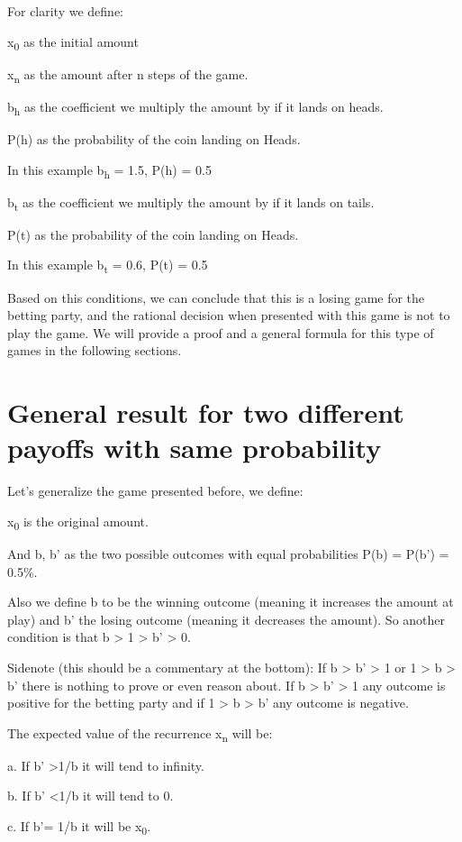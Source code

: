 \documentclass[12pt,reqno]{amsart}
\begin{document}
For clarity we define:

x\textsubscript{0} as the initial amount

x\textsubscript{n} as the amount after n steps of the game.

b\textsubscript{h} as the coefficient we multiply the amount by if it lands on heads.

P(h) as the probability of the coin landing on Heads. 

In this example b\textsubscript{h} = 1.5, P(h) = 0.5

b\textsubscript{t} as the coefficient we multiply the amount by if it lands on tails.

P(t) as the probability of the coin landing on Heads. 

In this example b\textsubscript{t} = 0.6, P(t) = 0.5

Based on this conditions, we can conclude that this is a losing game for the betting party, and the rational decision when presented with this game is not to play the game. We will provide a proof and a general formula for this type of games in the following sections.


\section{General result for two different payoffs with same probability}

Let's generalize the game presented before, we define:

x\textsubscript{0} is the original amount.

And b, b' as the two possible outcomes with equal probabilities P(b) = P(b') = 0.5\%. 

Also we define b to be the winning outcome (meaning it increases the amount at play) and b' the losing outcome (meaning it decreases the amount). So another condition is that b > 1 > b' > 0.

Sidenote (this should be a commentary at the bottom): If b > b' > 1 or 1 > b > b' there is nothing to prove or even reason about. If b > b' > 1 any outcome is positive for the betting party and if 1 > b > b' any outcome is negative. 

The expected value of the recurrence x\textsubscript{n} will be:

a. If b' \textgreater 1/b it will tend to infinity.

b. If b' \textless 1/b it will tend to 0.

c. If b'= 1/b it will be x\textsubscript{0}.
\end{document}
